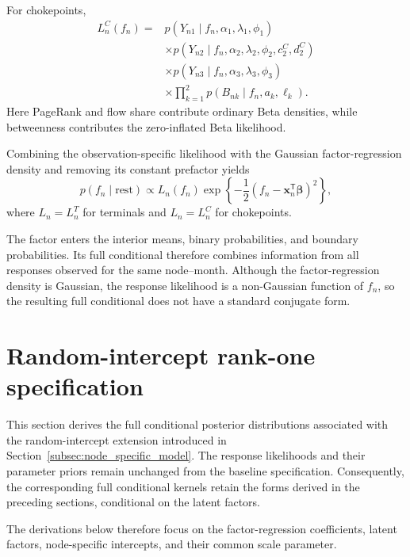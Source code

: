 \documentclass[pdftex,12pt,openright,a4paper,oneside]{book}
\begin{document}
For chokepoints,
\begin{equation*}
\begin{aligned}
L_n^C(f_n)
={}&
p(Y_{n1}\mid f_n,\alpha_1,\lambda_1,\phi_1)
\\
&\times
p(Y_{n2}\mid
f_n,\alpha_2,\lambda_2,\phi_2,c_2^C,d_2^C)
\\
&\times
p(Y_{n3}\mid f_n,\alpha_3,\lambda_3,\phi_3)
\\
&\times
\prod_{k=1}^{2}
p(B_{nk}\mid f_n,a_k,\ell_k).
\end{aligned}
\end{equation*}
Here PageRank and flow share contribute ordinary
Beta densities, while betweenness contributes
the zero-inflated Beta likelihood.

Combining the observation-specific likelihood
with the Gaussian factor-regression density
and removing its constant prefactor yields
\begin{equation*}
p(f_n\mid\mathrm{rest})
\propto
L_n(f_n)
\exp\!\left\{
-\frac12
\left(
f_n-\mathbf{x}_n^{\mathsf T}\boldsymbol{\beta}
\right)^2
\right\},
\end{equation*}
where $L_n=L_n^T$ for terminals and $L_n=L_n^C$
for chokepoints.

The factor enters the interior means, binary
probabilities, and boundary probabilities.
Its full conditional therefore combines information
from all responses observed for the same node--month.
Although the factor-regression density is Gaussian,
the response likelihood is a non-Gaussian function
of $f_n$, so the resulting full conditional does
not have a standard conjugate form.

\section{Random-intercept rank-one specification}
\label{app:random_intercept_conditionals}

This section derives the full conditional posterior
distributions associated with the random-intercept
extension introduced in
Section~\ref{subsec:node_specific_model}.
The response likelihoods and their parameter priors
remain unchanged from the baseline specification.
Consequently, the corresponding full conditional
kernels retain the forms derived in the preceding
sections, conditional on the latent factors.

The derivations below therefore focus on the
factor-regression coefficients, latent factors,
node-specific intercepts, and their common scale
parameter.
\end{document}

